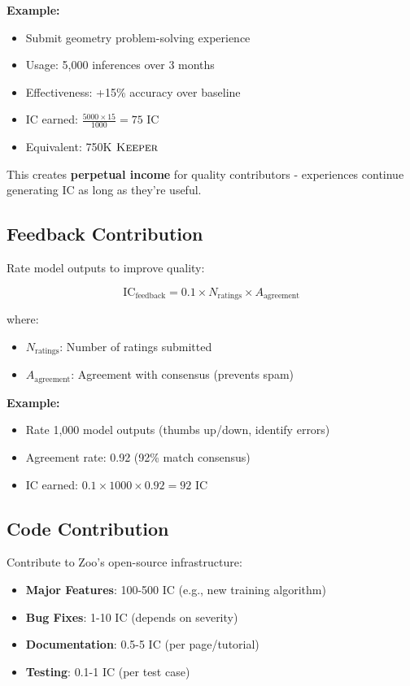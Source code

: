 \textbf{Example:}
\begin{itemize}
\item Submit geometry problem-solving experience
\item Usage: 5,000 inferences over 3 months
\item Effectiveness: +15\% accuracy over baseline
\item IC earned: $\frac{5000 \times 15}{1000} = 75$ IC
\item Equivalent: 750K $\textsc{Keeper}$
\end{itemize}

This creates \textbf{perpetual income} for quality contributors - experiences continue generating IC as long as they're useful.

\subsection{Feedback Contribution}

Rate model outputs to improve quality:

\begin{equation}
\text{IC}_{\text{feedback}} = 0.1 \times N_{\text{ratings}} \times A_{\text{agreement}}
\end{equation}

where:
\begin{itemize}
\item $N_{\text{ratings}}$: Number of ratings submitted
\item $A_{\text{agreement}}$: Agreement with consensus (prevents spam)
\end{itemize}

\textbf{Example:}
\begin{itemize}
\item Rate 1,000 model outputs (thumbs up/down, identify errors)
\item Agreement rate: 0.92 (92\% match consensus)
\item IC earned: $0.1 \times 1000 \times 0.92 = 92$ IC
\end{itemize}

\subsection{Code Contribution}

Contribute to Zoo's open-source infrastructure:

\begin{itemize}
\item \textbf{Major Features}: 100-500 IC (e.g., new training algorithm)
\item \textbf{Bug Fixes}: 1-10 IC (depends on severity)
\item \textbf{Documentation}: 0.5-5 IC (per page/tutorial)
\item \textbf{Testing}: 0.1-1 IC (per test case)
\end{itemize}

